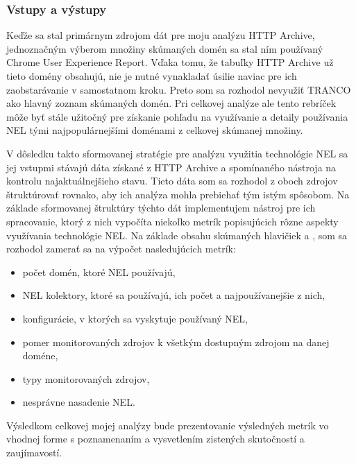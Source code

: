 \subsubsection{Vstupy a výstupy}

Keďže sa stal primárnym zdrojom dát pre moju analýzu HTTP Archive, jednoznačným výberom množiny skúmaných domén sa stal ním používaný Chrome User Experience Report. 
Vďaka tomu, že tabuľky HTTP Archive už tieto domény obsahujú, nie je nutné vynakladať úsilie naviac pre ich zaobstarávanie v samostatnom kroku. 
Preto som sa rozhodol nevyužiť TRANCO ako hlavný zoznam skúmaných domén.
Pri celkovej analýze ale tento rebríček môže byť stále užitočný pre získanie pohľadu na využívanie a detaily používania NEL tými najpopulárnejšími doménami z celkovej skúmanej množiny.

V dôsledku takto sformovanej stratégie pre analýzu využitia technológie NEL sa jej vstupmi stávajú dáta získané z HTTP Archive a spomínaného nástroja na kontrolu najaktuálnejšieho stavu.
Tieto dáta som sa rozhodol z oboch zdrojov štruktúrovať rovnako, aby ich analýza mohla prebiehať tým istým spôsobom.
Na základe sformovanej štruktúry týchto dát implementujem nástroj pre ich spracovanie, ktorý z nich vypočíta niekoľko metrík popisujúcich rôzne aspekty využívania technológie NEL.
Na základe obsahu skúmaných hlavičiek  a , som sa rozhodol zamerať sa na výpočet nasledujúcich metrík:
\begin{itemize}
    \item počet domén, ktoré NEL používajú,
    \item NEL kolektory, ktoré sa používajú, ich počet a najpoužívanejšie z nich,
    \item konfigurácie, v ktorých sa vyskytuje používaný NEL,
    \item pomer monitorovaných zdrojov k všetkým dostupným zdrojom na danej doméne,
    \item typy monitorovaných zdrojov,
    \item nesprávne nasadenie NEL.
\end{itemize}

Výsledkom celkovej mojej analýzy bude prezentovanie výsledných metrík vo vhodnej forme s poznamenaním a vysvetlením zistených skutočností a zaujímavostí. 

\pagebreak

